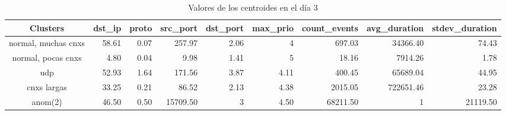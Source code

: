 \begin{table}[h]
    \begingroup
    \setlength{\tabcolsep}{2pt} %
    \renewcommand{\arraystretch}{2} %
    \hspace*{-3cm}
    \begin{tabular}{|c|r|r|r|r|r|r|r|r|}
    \hline
    \textbf{Clusters}   & \textbf{dst\_ip} & \textbf{proto} & \textbf{src\_port} & \textbf{dst\_port} & \textbf{max\_prio} & \textbf{count\_events} & \textbf{avg\_duration} & \textbf{stdev\_duration} \\ \hline
    normal, muchas cnxs & 58.61            & 0.07           & 257.97             & 2.06               & 4                  & 697.03                 & 34366.40               & 74.43                    \\ \hline
    normal, pocas cnxs  & 4.80             & 0.04           & 9.98               & 1.41               & 5                  & 18.16                  & 7914.26                & 1.78                     \\ \hline
    udp                 & 52.93            & 1.64           & 171.56             & 3.87               & 4.11               & 400.45                 & 65689.04               & 44.95                    \\ \hline
    cnxs largas         & 33.25            & 0.21           & 86.52              & 2.13               & 4.38               & 2015.05                & 722651.46              & 23.28                    \\ \hline
    anom(2)             & 46.50            & 0.50           & 15709.50           & 3                  & 4.50               & 68211.50               & 1                      & 21119.50                 \\ \hline
    \end{tabular}
    \endgroup
\bigskip
\caption{Valores de los centroides en el día 3}
\bigskip
\label{tab:dia3}
\end{table}

